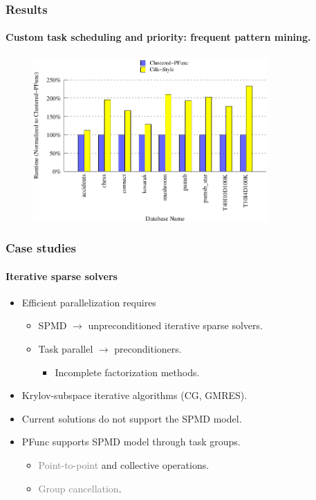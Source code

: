\documentclass{beamer}
\begin{document}
\begin{frame}[fragile]
\frametitle{Results}
\framesubtitle{Custom task scheduling and priority: frequent pattern mining.}
\begin{figure}
\includegraphics[width=0.8\textwidth]{figs/fim_8}
\label{fig:fim}
\end{figure}
\end{frame}

\begin{frame}[fragile]
\frametitle{Case studies}
\framesubtitle{Iterative sparse solvers}
\begin{itemize}
\item Efficient parallelization requires
  \begin{itemize}
  \item SPMD $\rightarrow{}$ unpreconditioned iterative sparse solvers.
  \item Task parallel $\rightarrow{}$ preconditioners.
    \begin{itemize}
    \item Incomplete factorization methods.
    \end{itemize}
  \end{itemize}
  \item Krylov-subspace iterative algorithms (CG, GMRES).
\item Current solutions do not support the SPMD model.
\item PFunc supports SPMD model through task groups.
  \begin{itemize}
  \item \textcolor{gray}{Point-to-point} and collective operations.
  \item \textcolor{gray}{Group cancellation}.
  \end{itemize}
\end{itemize}
\end{frame}
\end{document}
